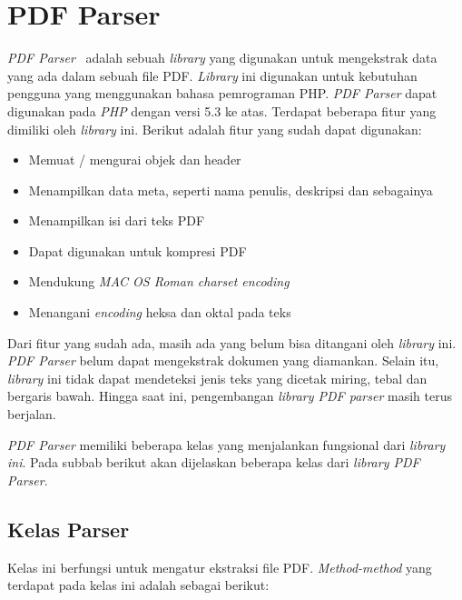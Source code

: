 \section{PDF Parser}
\label{sec:pdfparser}

\textit{PDF Parser}~\cite{pdfparser} adalah sebuah \textit{library} yang digunakan untuk mengekstrak data yang ada dalam sebuah file PDF. \textit{Library} ini digunakan untuk kebutuhan pengguna yang menggunakan bahasa pemrograman PHP. \textit{PDF Parser} dapat digunakan pada \textit{PHP} dengan versi 5.3 ke atas. Terdapat beberapa fitur yang dimiliki oleh \textit{library} ini. Berikut adalah fitur yang sudah dapat digunakan:

\begin{itemize}
	\item Memuat / mengurai objek dan header
	\item Menampilkan data meta, seperti nama penulis, deskripsi dan sebagainya
	\item Menampilkan isi dari teks PDF
	\item Dapat digunakan untuk kompresi PDF
	\item Mendukung \textit{MAC OS Roman charset encoding}
	\item Menangani \textit{encoding} heksa dan oktal pada teks
\end{itemize}

Dari fitur yang sudah ada, masih ada yang belum bisa ditangani oleh \textit{library} ini. \textit{PDF Parser} belum dapat mengekstrak dokumen yang diamankan. Selain itu, \textit{library} ini tidak dapat mendeteksi jenis teks yang dicetak miring, tebal dan bergaris bawah. Hingga saat ini, pengembangan \textit{library PDF parser} masih terus berjalan. 

\textit{PDF Parser} memiliki beberapa kelas yang menjalankan fungsional dari \textit{library ini}. Pada subbab berikut akan dijelaskan beberapa kelas dari \textit{library PDF Parser}.

\subsection{Kelas Parser}
Kelas ini berfungsi untuk mengatur ekstraksi file PDF. \textit{Method-method} yang terdapat pada kelas ini adalah sebagai berikut:

